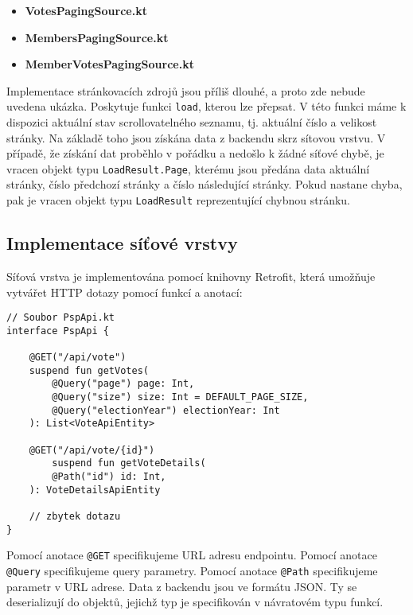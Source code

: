 \begin{itemize}
	\item \textbf{VotesPagingSource.kt}
	\item \textbf{MembersPagingSource.kt}
	\item \textbf{MemberVotesPagingSource.kt}
\end{itemize}

\noindent Implementace stránkovacích zdrojů jsou příliš dlouhé, a proto zde nebude uvedena ukázka. Poskytuje funkci \lstinline|load|, kterou lze přepsat. V této funkci máme k dispozici aktuální stav scrollovatelného seznamu, tj. aktuální číslo a velikost stránky. Na základě toho jsou získána data z backendu skrz sítovou vrstvu. V případě, že získání dat proběhlo v pořádku a nedošlo k žádné síťové chybě, je vracen objekt typu \lstinline|LoadResult.Page|, kterému jsou předána data aktuální stránky, číslo předchozí stránky a číslo následující stránky. Pokud nastane chyba, pak je vracen objekt typu \lstinline|LoadResult| reprezentující chybnou stránku.

\subsection{Implementace síťové vrstvy}
\label{sec:impl-network}

\noindent Síťová vrstva je implementována pomocí knihovny Retrofit, která umožňuje vytvářet HTTP dotazy pomocí funkcí a anotací:

\begin{lstlisting}[caption={Ukázka použití knihovny Retrofit pro získání seznamu hlasování z backendu}, label={lst:retrofit-votes}, tabsize=2]
// Soubor PspApi.kt
interface PspApi {
	
	@GET("/api/vote")
	suspend fun getVotes(
		@Query("page") page: Int,
		@Query("size") size: Int = DEFAULT_PAGE_SIZE,
		@Query("electionYear") electionYear: Int
	): List<VoteApiEntity>
	
	@GET("/api/vote/{id}")
		suspend fun getVoteDetails(
		@Path("id") id: Int,
	): VoteDetailsApiEntity
	
	// zbytek dotazu
}
\end{lstlisting}

\noindent Pomocí anotace \lstinline|@GET| specifikujeme URL adresu endpointu. Pomocí anotace \lstinline|@Query| specifikujeme query parametry. Pomocí anotace \lstinline|@Path| specifikujeme parametr v URL adrese. Data z backendu jsou ve formátu JSON. Ty se deserializují do objektů, jejichž typ je specifikován v návratovém typu funkcí.

